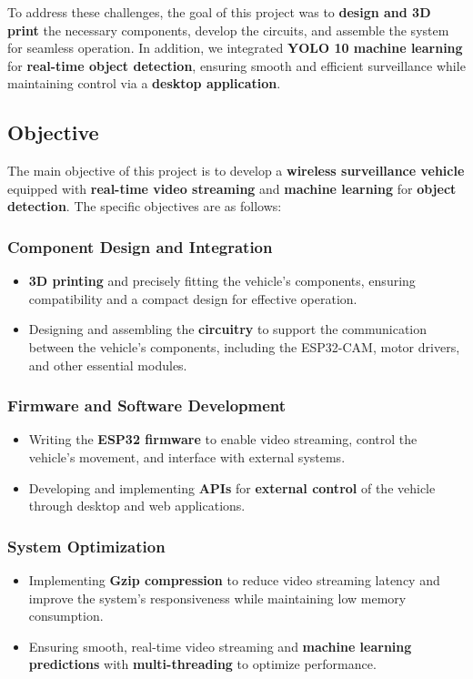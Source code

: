 \documentclass[12pt,a4paper]{report}
\begin{document}
To address these challenges, the goal of this project was to \textbf{design and 3D print} the necessary components, develop the circuits, and assemble the system for seamless operation. In addition, we integrated \textbf{YOLO 10 machine learning} for \textbf{real-time object detection}, ensuring smooth and efficient surveillance while maintaining control via a \textbf{desktop application}.

	\label{Objective}
	\subsection{Objective }


The main objective of this project is to develop a \textbf{wireless surveillance vehicle} equipped with \textbf{real-time video streaming} and \textbf{machine learning} for \textbf{object detection}. The specific objectives are as follows:

\subsubsection*{Component Design and Integration}
\begin{itemize}
    \item \textbf{3D printing} and precisely fitting the vehicle's components, ensuring compatibility and a compact design for effective operation.
    \item Designing and assembling the \textbf{circuitry} to support the communication between the vehicle's components, including the ESP32-CAM, motor drivers, and other essential modules.
\end{itemize}

\subsubsection*{Firmware and Software Development}
\begin{itemize}
    \item Writing the \textbf{ESP32 firmware} to enable video streaming, control the vehicle's movement, and interface with external systems.
    \item Developing and implementing \textbf{APIs} for \textbf{external control} of the vehicle through desktop and web applications.
\end{itemize}

\subsubsection*{System Optimization}
\begin{itemize}
    \item Implementing \textbf{Gzip compression} to reduce video streaming latency and improve the system's responsiveness while maintaining low memory consumption.
    \item Ensuring smooth, real-time video streaming and \textbf{machine learning predictions} with \textbf{multi-threading} to optimize performance.
\end{itemize}
\end{document}
